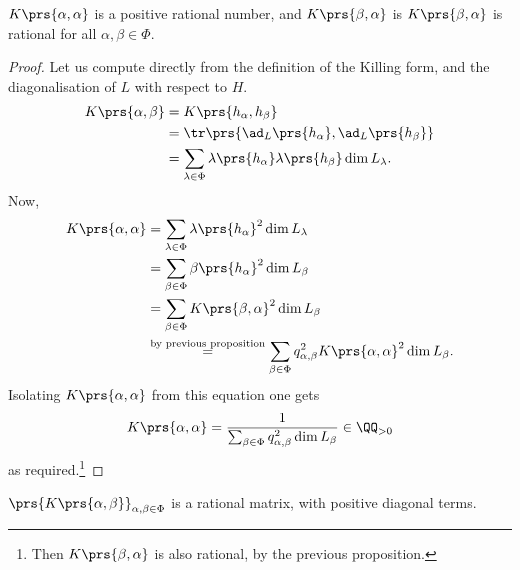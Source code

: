 \documentclass[10pt,a4paper,twoside,openany,hidelinks]{book}
\begin{document}
\begin{proposition}
$K\prs{\alpha,\alpha}$ is a positive rational number, and $K\prs{\beta,\alpha}$ is $K\prs{\beta,\alpha}$ is rational for all $\alpha,\beta\in\Phi$.
\end{proposition}
\begin{proof}
Let us compute directly from the definition of the Killing form, and the diagonalisation of $L$ with respect to $H$.
\begin{align*}
K\prs{\alpha,\beta} &= K\prs{h_{\alpha}, h_{\beta}} \\&= \tr\prs{\ad_L\prs{h_{\alpha}}, \ad_L\prs{h_{\beta}}} \\&=
\sum_{\lambda \in \Phi} \lambda\prs{h_{\alpha}} \lambda\prs{h_{\beta}} \dim L_{\lambda} \text{.}
\end{align*}
Now,
\begin{align*}
K\prs{\alpha,\alpha} &= \sum_{\lambda \in \Phi} \lambda\prs{h_{\alpha}}^2 \dim L_{\lambda} \\&= \sum_{\beta \in \Phi} \beta\prs{h_{\alpha}}^2 \dim L_{\beta} \\&= \sum_{\beta \in \Phi} K\prs{\beta,\alpha}^2 \dim L_{\beta} \\ &\stackrel{\text{by previous proposition}}{=} \sum_{\beta \in \Phi} q_{\alpha,\beta}^2 K\prs{\alpha,\alpha}^2 \dim L_{\beta} \text{.}
\end{align*}
Isolating $K\prs{\alpha,\alpha}$ from this equation one gets
\[K\prs{\alpha,\alpha} = \frac{1}{\sum_{\beta \in \Phi} q_{\alpha,\beta}^2 \dim L_{\beta}} \in \QQ_{>0}\]
as required.\footnote{Then $K\prs{\beta,\alpha}$ is also rational, by the previous proposition.}
\end{proof}
\begin{corollary}
$\prs{K\prs{\alpha,\beta}}_{\alpha,\beta \in \Phi}$ is a rational matrix, with positive diagonal terms.
\end{corollary}
\end{document}
